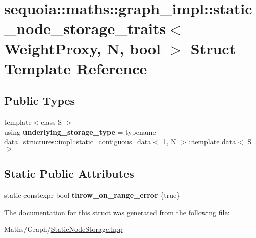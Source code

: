 \hypertarget{structsequoia_1_1maths_1_1graph__impl_1_1static__node__storage__traits}{}\section{sequoia\+::maths\+::graph\+\_\+impl\+::static\+\_\+node\+\_\+storage\+\_\+traits$<$ Weight\+Proxy, N, bool $>$ Struct Template Reference}
\label{structsequoia_1_1maths_1_1graph__impl_1_1static__node__storage__traits}
\subsection*{Public Types}
\begin{DoxyCompactItemize}
\item 
\mbox{\label{structsequoia_1_1maths_1_1graph__impl_1_1static__node__storage__traits_a2ca3c8429bbdf27382a712389a584091}} 
{\footnotesize template$<$class S $>$ }\\using {\bfseries underlying\+\_\+storage\+\_\+type} = typename \mbox{\hyperlink{structsequoia_1_1data__structures_1_1impl_1_1static__contiguous__data}{data\+\_\+structures\+::impl\+::static\+\_\+contiguous\+\_\+data}}$<$ 1, N $>$\+::template data$<$ S $>$
\end{DoxyCompactItemize}
\subsection*{Static Public Attributes}
\begin{DoxyCompactItemize}
\item 
\mbox{\label{structsequoia_1_1maths_1_1graph__impl_1_1static__node__storage__traits_a15207a91a769942648d509e6e37d59a2}} 
static constexpr bool {\bfseries throw\+\_\+on\+\_\+range\+\_\+error} \{true\}
\end{DoxyCompactItemize}


The documentation for this struct was generated from the following file\+:\begin{DoxyCompactItemize}
\item 
Maths/\+Graph/\mbox{\hyperlink{_static_node_storage_8hpp}{Static\+Node\+Storage.\+hpp}}\end{DoxyCompactItemize}
